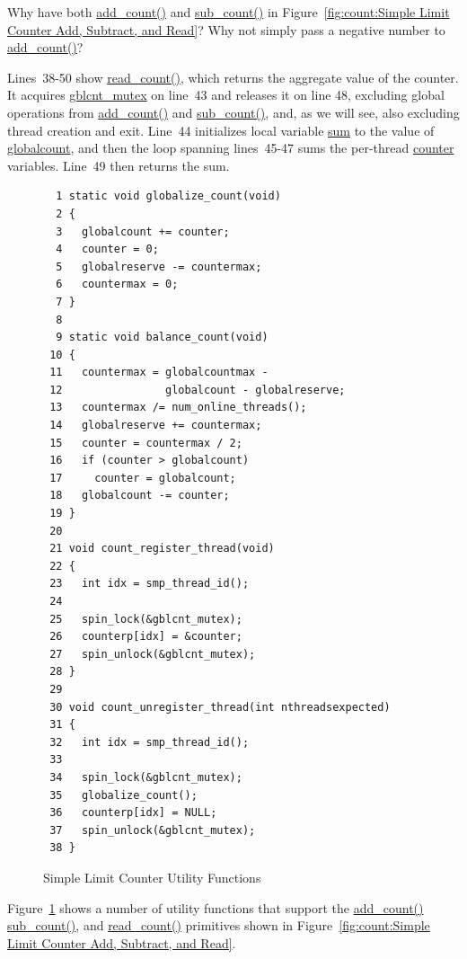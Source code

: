 \QuickQuiz{}
	Why have both \url{add_count()} and \url{sub_count()} in
	Figure~\ref{fig:count:Simple Limit Counter Add, Subtract, and Read}?
	Why not simply pass a negative number to \url{add_count()}?
 \QuickQuizEnd

Lines~38-50 show \url{read_count()}, which returns the aggregate value
of the counter.
It acquires \url{gblcnt_mutex} on line~43 and releases it on line 48,
excluding global operations from \url{add_count()} and \url{sub_count()},
and, as we will see, also excluding thread creation and exit.
Line~44 initializes local variable \url{sum} to the value of
\url{globalcount}, and then the loop spanning lines~45-47 sums the
per-thread \url{counter} variables.
Line~49 then returns the sum.

\begin{figure}[tbp]
{ \scriptsize
\begin{verbatim}
  1 static void globalize_count(void)
  2 {
  3   globalcount += counter;
  4   counter = 0;
  5   globalreserve -= countermax;
  6   countermax = 0;
  7 }
  8 
  9 static void balance_count(void)
 10 {
 11   countermax = globalcountmax -
 12                globalcount - globalreserve;
 13   countermax /= num_online_threads();
 14   globalreserve += countermax;
 15   counter = countermax / 2;
 16   if (counter > globalcount)
 17     counter = globalcount;
 18   globalcount -= counter;
 19 }
 20 
 21 void count_register_thread(void)
 22 {
 23   int idx = smp_thread_id();
 24 
 25   spin_lock(&gblcnt_mutex);
 26   counterp[idx] = &counter;
 27   spin_unlock(&gblcnt_mutex);
 28 }
 29 
 30 void count_unregister_thread(int nthreadsexpected)
 31 {
 32   int idx = smp_thread_id();
 33 
 34   spin_lock(&gblcnt_mutex);
 35   globalize_count();
 36   counterp[idx] = NULL;
 37   spin_unlock(&gblcnt_mutex);
 38 }
\end{verbatim}
}
\caption{Simple Limit Counter Utility Functions}
\label{fig:count:Simple Limit Counter Utility Functions}
\end{figure}

Figure~\ref{fig:count:Simple Limit Counter Utility Functions}
shows a number of utility functions that support the \url{add_count()}
\url{sub_count()}, and \url{read_count()} primitives shown in
Figure~\ref{fig:count:Simple Limit Counter Add, Subtract, and Read}.

